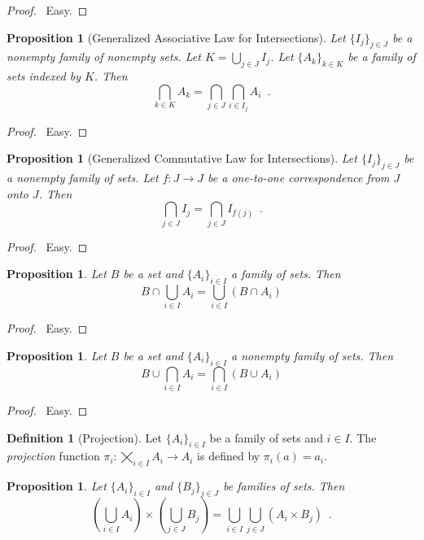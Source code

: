 \documentclass{report}
\let\qed\relax
\newtheorem{prop}[ax]{Proposition}
\theoremstyle{definition}
\newtheorem{df}[ax]{Definition}
\begin{document}
\begin{proof}
\pf\ Easy. \qed
\end{proof}

\begin{prop}[Generalized Associative Law for Intersections]
Let $\{I_j\}_{j \in J}$ be a nonempty family of nonempty sets. Let $K = \bigcup_{j \in J} I_j$. Let $\{A_k\}_{k \in K}$ be a family of sets indexed by $K$. Then
\[ \bigcap_{k \in K} A_k = \bigcap_{j \in J} \bigcap_{i \in I_j} A_i \enspace . \]
\end{prop}

\begin{proof}
\pf\ Easy. \qed
\end{proof}

\begin{prop}[Generalized Commutative Law for Intersections]
Let $\{I_j\}_{j \in J}$ be a nonempty family of sets. Let $f : J \rightarrow J$ be a one-to-one correspondence from $J$ onto $J$. Then
\[ \bigcap_{j \in J} I_j = \bigcap_{j \in J} I_{f(j)} \enspace . \]
\end{prop}

\begin{proof}
\pf\ Easy. \qed
\end{proof}

\begin{prop}
Let $B$ be a set and $\{A_i\}_{i \in I}$ a family of sets. Then
\[ B \cap \bigcup_{i \in I} A_i = \bigcup_{i \in I}
 (B \cap A_i) \]
\end{prop}

\begin{proof}
\pf\ Easy. \qed
\end{proof}

\begin{prop}
Let $B$ be a set and $\{A_i\}_{i \in I}$ a nonempty family of sets. Then
\[ B \cup \bigcap_{i \in I} A_i = \bigcap_{i \in I}
 (B \cup A_i) \]
\end{prop}

\begin{proof}
\pf\ Easy. \qed
\end{proof}

\begin{df}[Projection]
Let $\{A_i\}_{i \in I}$ be a family of sets and $i \in I$. The \emph{projection} function $\pi_i : \bigtimes_{i \in I} A_i \rightarrow A_i$ is defined by $\pi_i(a) = a_i$.
\end{df}

\begin{prop}
Let $\{A_i\}_{i \in I}$ and $\{B_j\}_{j \in J}$ be families of sets. Then
\[ \left( \bigcup_{i \in I} A_i \right) \times \left( \bigcup_{j \in J} B_j \right) = \bigcup_{i \in I} \bigcup_{j \in J} (A_i \times B_j) \enspace . \]
\end{prop}
\end{document}
